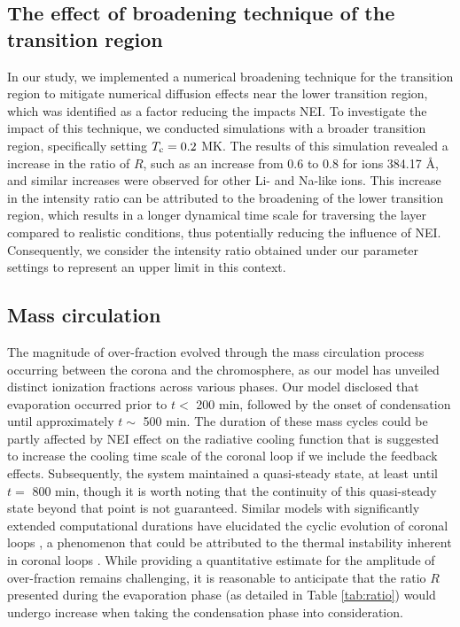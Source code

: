 \documentclass[fleqn,usenatbib]{mnras}
\begin{document}
\subsection{The effect of broadening technique of the transition region}

In our study, we implemented a numerical broadening technique for the transition region to mitigate numerical diffusion effects near the lower transition region, which was identified as a factor reducing the impacts NEI. 
To investigate the impact of this technique, we conducted simulations with a broader transition region, specifically setting $T_{\rm c}=0.2$ MK. 
The results of this simulation revealed a increase in the ratio of $R$, such as an increase from 0.6 to 0.8 for  ions 384.17 \AA, and similar increases were observed for other Li- and Na-like ions. 
This increase in the intensity ratio can be attributed to the broadening of the lower transition region, which results in a longer dynamical time scale for traversing the layer compared to realistic conditions, thus potentially reducing the influence of NEI.
Consequently, we consider the intensity ratio obtained under our parameter settings to represent an upper limit in this context.

\subsection{Mass circulation}

The magnitude of over-fraction evolved through the mass circulation process occurring between the corona and the chromosphere, as our model has unveiled distinct ionization fractions across various phases.
Our model disclosed that evaporation occurred prior to $t<$ 200 min, followed by the onset of condensation until approximately $t\sim$ 500 min. 
The duration of these mass cycles could be partly affected by NEI effect on the radiative cooling function that is suggested to increase the cooling time scale of the coronal loop \citep{2003A&A...401..699B} if we include the feedback effects.
Subsequently, the system maintained a quasi-steady state, at least until $t=$ 800 min, though it is worth noting that the continuity of this quasi-steady state beyond that point is not guaranteed.
Similar models with significantly extended computational durations have elucidated the cyclic evolution of coronal loops \citep{2019ApJ...885..164W}, a phenomenon that could be attributed to the thermal instability inherent in coronal loops \citep{1982A&A...108L...1K}.
While providing a quantitative estimate for the amplitude of over-fraction remains challenging, it is reasonable to anticipate that the ratio $R$ presented during the evaporation phase (as detailed in Table \ref{tab:ratio}) would undergo increase when taking the condensation phase into consideration.
\end{document}
